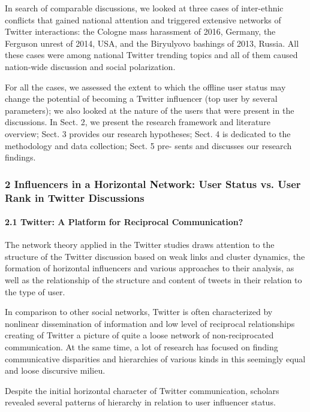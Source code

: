 In search of comparable discussions, we looked at three cases of inter-ethnic conflicts that gained national attention and triggered extensive networks of Twitter interactions: the Cologne mass harassment of 2016, Germany, the Ferguson unrest of 2014, USA, and the Biryulyovo bashings of 2013, Russia. All these cases were among national Twitter trending topics and all of them caused nation-wide discussion and social polarization.

For all the cases, we assessed the extent to which the offline user status may change the potential of becoming a Twitter influencer (top user by several parameters); we also looked at the nature of the users that were present in the discussions. In Sect. 2, we present the research framework and literature overview; Sect. 3 provides our research hypotheses; Sect. 4 is dedicated to the methodology and data collection; Sect. 5 pre- sents and discusses our research findings.

\subsubsection{2 Influencers in a Horizontal Network: User Status vs. User Rank in Twitter Discussions}

\paragraph{2.1 Twitter: A Platform for Reciprocal Communication?} The network theory applied in the Twitter studies draws attention to the structure of the Twitter discussion based on weak links and cluster dynamics, the formation of horizontal influencers and various approaches to their analysis, as well as the relationship of the structure and content of tweets in their relation to the type of user.

In comparison to other social networks, Twitter is often characterized by nonlinear dissemination of information \cite{BrunsBurgees2012} and low level of reciprocal relationships \cite{BakshyHofmanMason,Habermas,KwakLeePark} creating of Twitter a picture of quite a loose network of non-reciprocated communication. At the same time, a lot of research has focused on finding communicative disparities and hierarchies of various kinds in this seemingly equal and loose discursive milieu.

Despite the initial horizontal character of Twitter communication, scholars revealed several patterns of hierarchy in relation to user influencer status.

